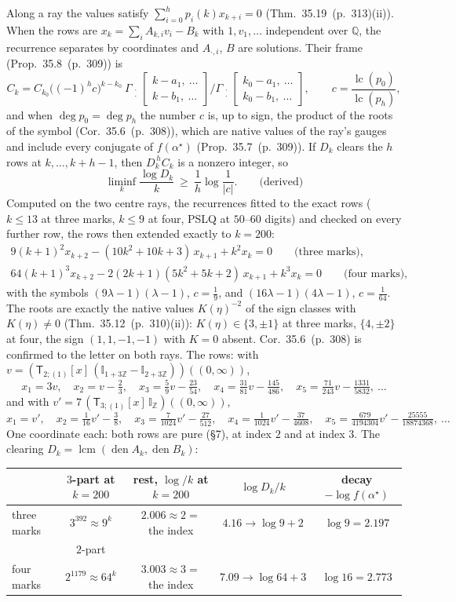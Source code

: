 \documentclass[11pt]{article}
\newcommand{\sT}{\mathsf T}
\newcommand{\Gst}[4]{\Gamma_{\substack{#1\\#2}}\!\begin{bmatrix}#3\\#4\end{bmatrix}}
\newcommand{\IZ}{\mathbb I_{\mathbb Z}}
\newcommand{\Ilat}[1]{\mathbb I_{#1}}
\newcommand{\Tx}[3]{(\sT_{#1;(1)}[x]\,#2)((#3,\infty))}
\newcommand{\hb}[2]{#1~(p.~#2)}   %
\theoremstyle{plain}
\theoremstyle{remark}
\begin{document}
Along a ray the values satisfy $\sum_{i=0}^hp_i(k)x_{k+i}=0$ (Thm.~\hb{35.19}{313}(ii)). When the rows are $x_k=\sum_iA_{k,i}v_i-B_k$ with $1,v_1,\dots$ independent over $\mathbb Q$, the recurrence separates by coordinates and $A_{\cdot,i}$, $B$ are solutions. Their frame (Prop.~\hb{35.8}{309}) is
\[
C_k=C_{k_0}\big((-1)^hc\big)^{k-k_0}\ \Gst{\cdot}{\cdot}{k-a_1,\ \dots}{k-b_1,\ \dots}\Big/\Gst{\cdot}{\cdot}{k_0-a_1,\ \dots}{k_0-b_1,\ \dots},\qquad c=\frac{\operatorname{lc}(p_0)}{\operatorname{lc}(p_h)},
\]
and when $\deg p_0=\deg p_h$ the number $c$ is, up to sign, the product of the roots of the symbol (Cor.~\hb{35.6}{308}), which are native values of the ray's gauges and include every conjugate of $f(\alpha^\star)$ (Prop.~\hb{35.7}{309}). If $D_k$ clears the $h$ rows at $k,\dots,k+h-1$, then $D_k^{\,h}C_k$ is a nonzero integer, so
\[
\liminf_k\frac{\log D_k}{k}\ \ge\ \frac1h\log\frac1{|c|}.\qquad\text{(derived)}
\]
Computed on the two centre rays, the recurrences fitted to the exact rows ($k\le13$ at three marks, $k\le9$ at four, PSLQ at $50$--$60$ digits) and checked on every further row, the rows then extended exactly to $k=200$:
\begin{gather*}
9(k+1)^2x_{k+2}-(10k^2+10k+3)\,x_{k+1}+k^2x_k=0\qquad\text{(three marks)},\\
64(k+1)^3x_{k+2}-2(2k+1)(5k^2+5k+2)\,x_{k+1}+k^3x_k=0\qquad\text{(four marks)},
\end{gather*}
with the symbols $(9\lambda-1)(\lambda-1)$, $c=\frac19$, and $(16\lambda-1)(4\lambda-1)$, $c=\frac1{64}$.
The roots are exactly the native values $K(\eta)^{-2}$ of the sign classes with $K(\eta)\neq0$ (Thm.~\hb{35.12}{310}(ii)): $K(\eta)\in\{3,\pm1\}$ at three marks, $\{4,\pm2\}$ at four, the sign $(1,1,-1,-1)$ with $K=0$ absent. Cor.~\hb{35.6}{308} is confirmed to the letter on both rays. The rows: with $v=\Tx{2}{(\Ilat{1+3\mathbb Z}-\Ilat{2+3\mathbb Z})}{0}$,
\[
x_1=3v,\quad x_2=v-\tfrac23,\quad x_3=\tfrac59v-\tfrac{23}{54},\quad x_4=\tfrac{31}{81}v-\tfrac{145}{486},\quad x_5=\tfrac{71}{243}v-\tfrac{1331}{5832},\ \dots
\]
and with $v'=7\,\Tx3{\IZ}0$,
\[
x_1=v',\quad x_2=\tfrac1{16}v'-\tfrac38,\quad x_3=\tfrac{7}{1024}v'-\tfrac{27}{512},\quad x_4=\tfrac1{1024}v'-\tfrac{37}{4608},\quad x_5=\tfrac{679}{4194304}v'-\tfrac{25555}{18874368},\ \dots
\]
One coordinate each: both rows are pure (\S7), at index $2$ and at index $3$. The clearing $D_k=\operatorname{lcm}(\operatorname{den}A_k,\operatorname{den}B_k)$:
\begin{center}\small
\begin{tabular}{lcccc}
\toprule
& $3$-part at $k=200$ & rest, $\log/k$ at $k=200$ & $\log D_k/k$ & decay $-\log f(\alpha^\star)$\\
\midrule
three marks & $3^{392}\approx9^{k}$ & $2.006\approx2=$ the index & $4.16\to\log9+2$ & $\log9=2.197$\\
& $2$-part & & & \\
four marks & $2^{1179}\approx64^{k}$ & $3.003\approx3=$ the index & $7.09\to\log64+3$ & $\log16=2.773$\\
\bottomrule
\end{tabular}
\end{center}
\end{document}
